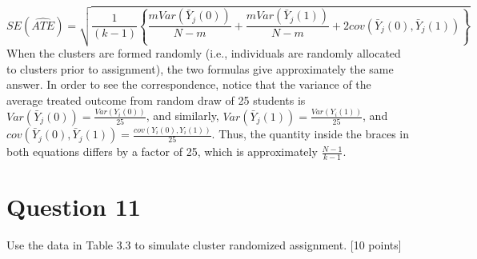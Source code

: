 \documentclass[11pt,notitlepage]{article}\usepackage[]{graphicx}\usepackage[]{color}
\begin{document}
\begin{equation*}
SE(\widehat{ATE}) = \sqrt{\frac{1}{(k-1)} \left \{ \frac{mVar(\bar{Y}_j (0))}{N- m} + \frac{mVar(\bar{Y}_j (1))}{N- m} + 2cov(\bar{Y}_j(0), \bar{Y}_j(1))\right \}}
\end{equation*}
When the clusters are formed randomly (i.e., individuals are randomly allocated to clusters prior to assignment), the two formulas give approximately the same answer. In order to see the correspondence, notice that the variance of the average treated outcome from random draw of 25 students is $Var(\bar{Y}_j(0)) = \frac{Var(Y_i (0))}{25}$, and similarly, $Var(\bar{Y}_j(1)) = \frac{Var(Y_i (1))}{25}$, and $cov(\bar{Y}_j(0), \bar{Y}_j(1)) = \frac{cov(Y_i(0), Y_i(1))}{25}$. Thus, the quantity inside the braces in both equations differs by a factor of 25, which is approximately $\frac{N-1}{k-1}$.

\section*{Question 11}

Use the data in Table 3.3 to simulate cluster randomized assignment. [10 points]
\end{document}
